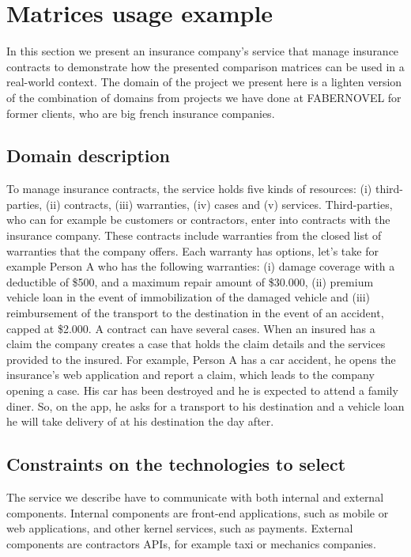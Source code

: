 \section{Matrices usage example}

In this section we present an insurance company's service that manage insurance contracts to demonstrate how the presented comparison matrices can be used in a real-world context. The domain of the project we present here is a lighten version of the combination of domains from projects we have done at FABERNOVEL for former clients, who are big french insurance companies.

\subsection{Domain description}

To manage insurance contracts, the service holds five kinds of resources: (i) third-parties, (ii) contracts, (iii) warranties, (iv) cases and (v) services. Third-parties, who can for example be customers or contractors, enter into contracts with the insurance company. These contracts include warranties from the closed list of warranties that the company offers. Each warranty has options, let's take for example Person A who has the following warranties: (i) damage coverage with a deductible of \$500, and a maximum repair amount of \$30.000, (ii) premium vehicle loan in the event of immobilization of the damaged vehicle and (iii) reimbursement of the transport to the destination in the event of an accident, capped at \$2.000. A contract can have several cases. When an insured has a claim the company creates a case that holds the claim details and the services provided to the insured. For example, Person A has a car accident, he opens the insurance's web application and report a claim, which leads to the company opening a case. His car has been destroyed and he is expected to attend a family diner. So, on the app, he asks for a transport to his destination and a vehicle loan he will take delivery of at his destination the day after.

\subsection{Constraints on the technologies to select}

The service we describe have to communicate with both internal and external components. Internal components are front-end applications, such as mobile or web applications, and other kernel services, such as payments. External components are contractors APIs, for example taxi or mechanics companies. 

